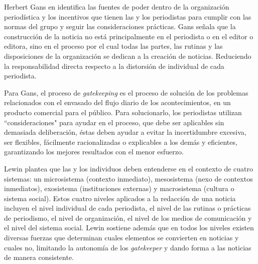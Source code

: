 
Herbert Gans en \cite{gans1979deciding} identifica las fuentes de poder dentro de la organización periodística y los incentivos que tienen las y los periodistas para cumplir con las normas del grupo y seguir las consideraciones prácticas. Gans señala que la construcción de la noticia no está principalmente en el periodista o en el editor o editora, sino en el proceso por el cual todas las partes, las rutinas y las disposiciones de la organización se dedican a la creación de noticias. Reduciendo la responsabilidad directa respecto a la distorsión de individual de cada periodista.

Para Gans, el proceso de \emph{gatekeeping} es el proceso de solución de los problemas relacionados con el envasado del flujo diario de los acontecimientos, en un producto comercial para el público. Para solucionarlo, los periodistas utilizan ``consideraciones" para ayudar en el proceso, que debe ser aplicables sin demasiada deliberación, éstas deben ayudar a evitar la incertidumbre excesiva, ser flexibles, fácilmente racionalizadas o explicables a los demás y eficientes, garantizando los mejores resultados con el menor esfuerzo. 


Lewin \cite{lewin1951field} plantea que las y los individuos deben entenderse en el contexto de cuatro sistemas: un microsistema (contexto inmediato), mesosistema (nexo de contextos inmediatos), exosistema (instituciones externas) y macrosistema (cultura o sistema social). Estos cuatro niveles aplicados a la redacción de una noticia incluyen el nivel individual de cada periodista, el nivel de las rutinas o prácticas de periodismo, el nivel de organización, el nivel de los medios de comunicación y el nivel del sistema social. Lewin sostiene además que en todos los niveles existen diversas fuerzas que determinan cuales elementos se convierten en noticias y cuales no, limitando la autonomía de los \emph{gatekeeper} y dando forma a las noticias de manera consistente.

